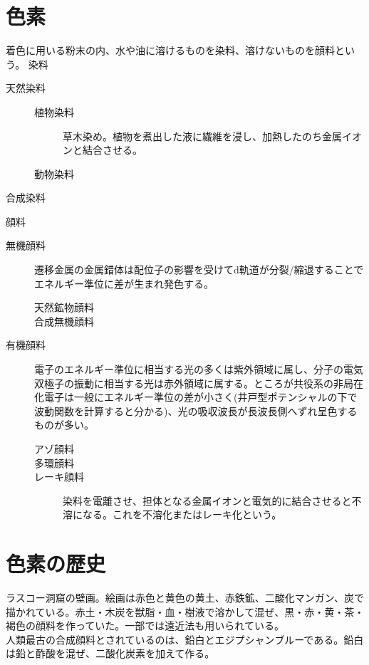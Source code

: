 	\section{色素}
		着色に用いる粉末の内、水や油に溶けるものを染料、溶けないものを顔料という。
		染料
		\begin{description}
			\item[天然染料]
			\begin{description}
				\item[植物染料] 草木染め。植物を煮出した液に繊維を浸し、加熱したのち金属イオンと結合させる。
				\item[動物染料]
			\end{description}
			\item[合成染料]
		\end{description}
		顔料
		\begin{description}
			\item[無機顔料] 遷移金属の金属錯体は配位子の影響を受けてd軌道が分裂/縮退することでエネルギー準位に差が生まれ発色する。
				\begin{description}
					\item[天然鉱物顔料] 
					\item[合成無機顔料] 
				\end{description}
			\item[有機顔料] 電子のエネルギー準位に相当する光の多くは紫外領域に属し、分子の電気双極子の振動に相当する光は赤外領域に属する。ところが共役系の非局在化電子は一般にエネルギー準位の差が小さく(井戸型ポテンシャルの下で波動関数を計算すると分かる)、光の吸収波長が長波長側へずれ呈色するものが多い。
				\begin{description}
					\item[アゾ顔料] 
					\item[多環顔料] 
					\item[レーキ顔料] 染料を電離させ、担体となる金属イオンと電気的に結合させると不溶になる。これを不溶化またはレーキ化という。
				\end{description}
		\end{description}
	\section{色素の歴史}
		ラスコー洞窟の壁画。絵画は赤色と黄色の黄土、赤鉄鉱、二酸化マンガン、炭で描かれている。赤土・木炭を獣脂・血・樹液で溶かして混ぜ、黒・赤・黄・茶・褐色の顔料を作っていた。一部では遠近法も用いられている。\\
		人類最古の合成顔料とされているのは、鉛白とエジプシャンブルーである。鉛白は鉛と酢酸を混ぜ、二酸化炭素を加えて作る。
